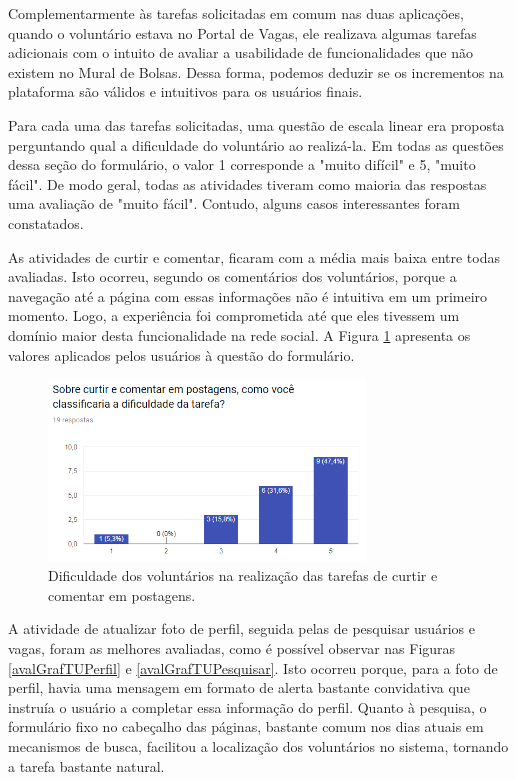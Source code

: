Complementarmente às tarefas solicitadas em comum nas duas aplicações, quando o voluntário estava no Portal de Vagas, ele realizava algumas tarefas adicionais com o intuito de avaliar a usabilidade de funcionalidades que não existem no Mural de Bolsas. Dessa forma, podemos deduzir se os incrementos na plataforma são válidos e intuitivos para os usuários finais.

Para cada uma das tarefas solicitadas, uma questão de escala linear era proposta perguntando qual a dificuldade do voluntário ao realizá-la. Em todas as questões dessa seção do formulário, o valor 1 corresponde a "muito difícil" e 5, "muito fácil". De modo geral, todas as atividades tiveram como maioria das respostas uma avaliação de "muito fácil". Contudo, alguns casos interessantes foram constatados. 

As atividades de curtir e comentar, ficaram com a média mais baixa entre todas avaliadas. Isto ocorreu, segundo os comentários dos voluntários, porque a navegação até a página com essas informações não é intuitiva em um primeiro momento. Logo, a experiência foi comprometida até que eles tivessem um domínio maior desta funcionalidade na rede social. A Figura \ref{avalGrafTUCurtir} apresenta os valores aplicados pelos usuários à questão do formulário.

\begin{figure}[h]
    \caption{Dificuldade dos voluntários na realização das tarefas de curtir e comentar em postagens.}
       	\begin{center}
            \includegraphics[width=0.75\textwidth]{figuras/avaliacao/pdv-4.png}
        \end{center}
    \label{avalGrafTUCurtir}
\end{figure} 


A atividade de atualizar foto de perfil, seguida pelas de pesquisar usuários e vagas, foram as melhores avaliadas, como é possível observar nas Figuras \ref{avalGrafTUPerfil} e \ref{avalGrafTUPesquisar}. Isto ocorreu porque, para a foto de perfil, havia uma mensagem em formato de alerta bastante convidativa que instruía o usuário a completar essa informação do perfil. Quanto à pesquisa, o formulário fixo no cabeçalho das páginas, bastante comum nos dias atuais em mecanismos de busca, facilitou a localização dos voluntários no sistema, tornando a tarefa bastante natural.

